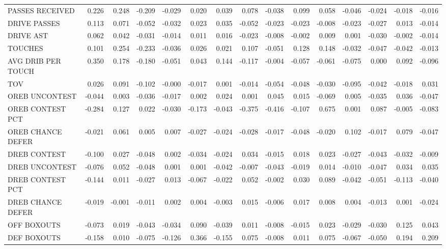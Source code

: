 \begin{tabular}{lrrrrrrrrrrrrrr}
PASSES RECEIVED & 0.226 & 0.248 & -0.209 & -0.029 & 0.020 & 0.039 & 0.078 & -0.038 & 0.099 & 0.058 & -0.046 & -0.024 & -0.018 & -0.016 \\
DRIVE PASSES & 0.113 & 0.071 & -0.052 & -0.032 & 0.023 & 0.035 & -0.052 & -0.023 & -0.023 & -0.008 & -0.023 & -0.027 & 0.013 & -0.014 \\
DRIVE AST & 0.062 & 0.042 & -0.031 & -0.014 & 0.011 & 0.016 & -0.023 & -0.008 & -0.002 & 0.009 & 0.001 & -0.030 & -0.002 & -0.014 \\
TOUCHES & 0.101 & 0.254 & -0.233 & -0.036 & 0.026 & 0.021 & 0.107 & -0.051 & 0.128 & 0.148 & -0.032 & -0.047 & -0.042 & -0.013 \\
AVG DRIB PER TOUCH & 0.350 & 0.178 & -0.180 & -0.051 & 0.043 & 0.144 & -0.117 & -0.004 & -0.057 & -0.061 & -0.075 & 0.000 & 0.092 & -0.096 \\
TOV & 0.026 & 0.091 & -0.102 & -0.000 & -0.017 & 0.001 & -0.014 & -0.054 & -0.048 & -0.030 & -0.095 & -0.042 & -0.018 & 0.031 \\
OREB UNCONTEST & -0.044 & 0.003 & -0.036 & -0.017 & 0.002 & 0.024 & 0.001 & 0.045 & 0.015 & -0.069 & 0.005 & -0.035 & 0.036 & -0.047 \\
OREB CONTEST PCT & -0.284 & 0.127 & 0.022 & -0.030 & -0.173 & -0.043 & -0.375 & -0.416 & -0.107 & 0.675 & 0.001 & 0.087 & -0.005 & -0.083 \\
OREB CHANCE DEFER & -0.021 & 0.061 & 0.005 & 0.007 & -0.027 & -0.024 & -0.028 & -0.017 & -0.048 & -0.020 & 0.102 & -0.017 & 0.079 & -0.047 \\
DREB CONTEST & -0.100 & 0.027 & -0.048 & 0.002 & -0.034 & -0.024 & 0.034 & -0.015 & 0.018 & 0.023 & -0.027 & -0.043 & -0.032 & -0.009 \\
DREB UNCONTEST & -0.076 & 0.052 & -0.048 & 0.001 & 0.001 & -0.042 & -0.007 & -0.043 & -0.019 & 0.014 & -0.010 & -0.047 & 0.034 & 0.035 \\
DREB CONTEST PCT & -0.144 & 0.011 & -0.027 & 0.013 & -0.067 & -0.022 & 0.052 & -0.002 & 0.030 & 0.089 & -0.042 & -0.051 & -0.113 & -0.040 \\
DREB CHANCE DEFER & -0.019 & -0.001 & -0.011 & 0.002 & 0.004 & -0.003 & 0.015 & -0.006 & 0.017 & 0.008 & 0.004 & -0.013 & 0.001 & -0.024 \\
OFF BOXOUTS & -0.073 & 0.019 & -0.043 & -0.034 & 0.090 & -0.039 & 0.011 & -0.008 & -0.015 & 0.023 & -0.029 & -0.030 & 0.125 & 0.043 \\
DEF BOXOUTS & -0.158 & 0.010 & -0.075 & -0.126 & 0.366 & -0.155 & 0.075 & -0.008 & 0.011 & 0.075 & -0.067 & -0.050 & 0.194 & 0.209 \\
\bottomrule
\end{tabular}

